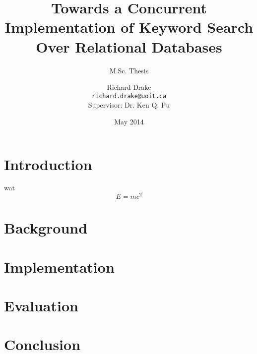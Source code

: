 \documentclass[compress]{beamer}
\title[M.Sc. Thesis -- \insertframenumber/\inserttotalframenumber]{Towards a Concurrent Implementation of Keyword Search Over Relational Databases}
\subtitle{M.Sc. Thesis}
\author[\copyright 2014 Richard Drake]{Richard Drake \\ \vspace{0.3em} \scriptsize{\texttt{richard.drake@uoit.ca}} \\ \vspace{1em} \tiny Supervisor:  Dr. Ken Q. Pu}
\institute[UOIT]{University of Ontario Institute of Technology \\ Oshawa, Ontario, Canada}
\date{\tiny May 2014}
\begin{document}
	
	
	
	\frame{\maketitle}
	
	
	\section{Introduction}
		\begin{frame}{wat}
			\[E = mc^2\]
		\end{frame}
	
	\section{Background}
	
	\section{Implementation}
	
	\section{Evaluation}
	
	\section{Conclusion}
	
	\section*{}
	
	\frame{\titlepage}
\end{document}
